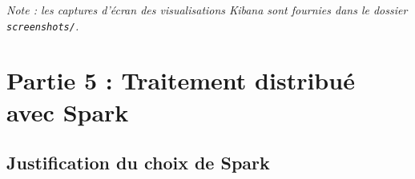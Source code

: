 \documentclass[12pt,a4paper]{article}
\begin{document}







\textit{Note : les captures d'écran des visualisations Kibana sont fournies dans le dossier \texttt{screenshots/}.}

\section{Partie 5 : Traitement distribué avec Spark}

\subsection{Justification du choix de Spark}
\end{document}
